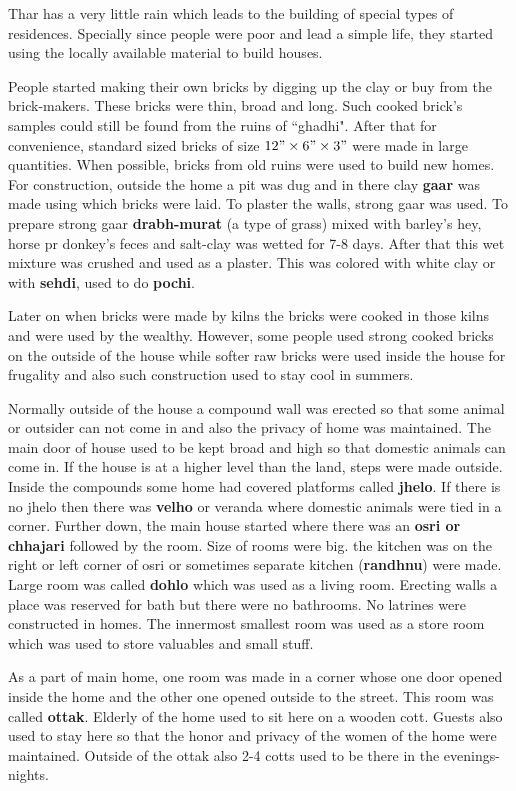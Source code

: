 Thar has a very little rain which leads to the building of special types of
residences. Specially since people were poor and lead a simple life, they
started using the locally available material to build houses.

People started making their own bricks by digging up the clay or buy from the
brick-makers. These bricks were thin, broad and long. Such cooked brick's
samples could still be found from the ruins of ``ghadhi". After that for
convenience, standard sized bricks of size $12" \times 6" \times 3"$ were made
in large quantities. When possible, bricks from old ruins were used to build new
homes. For construction, outside the home a pit was dug and in there clay
\textbf{gaar} was made using which bricks were laid. To plaster the walls,
strong gaar was used. To prepare strong gaar \textbf{drabh-murat} (a type of
grass) mixed with barley's hey, horse pr donkey's feces and salt-clay was wetted
for 7-8 days. After that this wet mixture was crushed and used as a plaster.
This was colored with white clay or with \textbf{sehdi}, used to do
\textbf{pochi}.

Later on when bricks were made by kilns the bricks were cooked in those kilns
and were used by the wealthy. However, some people used strong cooked bricks on
the outside of the house while softer raw bricks were used inside the house for
frugality and also such construction used to stay cool in summers.

Normally outside of the house a compound wall was erected so that some animal or
outsider can not come in and also the privacy of home was maintained. The main
door of house used to be kept broad and high so that domestic animals can come
in. If the house is at a higher level than the land, steps were made outside.
Inside the compounds some home had covered platforms called \textbf{jhelo}. If
there is no jhelo then there was \textbf{velho} or veranda where domestic
animals were tied in a corner. Further down, the main house started where there
was an \textbf{osri or chhajari} followed by the room. Size of rooms were big.
the kitchen was on the right or left corner of osri or sometimes separate
kitchen (\textbf{randhnu}) were made. Large room was called \textbf{dohlo} which
was used as a living room. Erecting walls a place was reserved for bath but
there were no bathrooms. No latrines were constructed in homes. The innermost
smallest room was used as a store room which was used to store valuables and
small stuff. 

As a part of main home, one room was made in a corner whose one door opened
inside the home and the other one opened outside to the street. This room was
called \textbf{ottak}. Elderly of the home used to sit here on a wooden cott.
Guests also used to stay here so that the honor and privacy of the women of the
home were maintained. Outside of the ottak also 2-4 cotts used to be there in
the evenings-nights.

